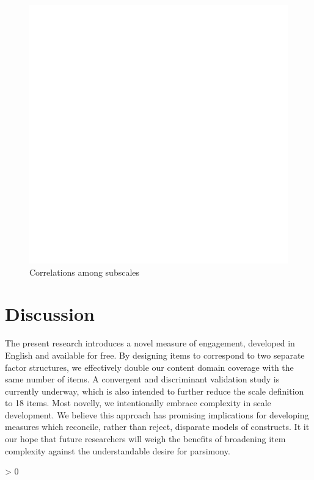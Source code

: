 \documentclass[
]{article}
\newlength{\cslhangindent}
\newenvironment{CSLReferences}[2] %
 {%
  \setlength{\parindent}{0pt}
  \ifodd #1 \everypar{\setlength{\hangindent}{\cslhangindent}}\ignorespaces\fi
  \ifnum #2 > 0
  \setlength{\parskip}{#2\baselineskip}
  \fi
 }%
 {}
\begin{document}
\begin{figure}

{\centering \includegraphics[width=0.8\linewidth]{corrplot} 

}

\caption{Correlations among subscales}\label{fig:corrplot}
\end{figure}

\hypertarget{discussion}{%
\section{Discussion}\label{discussion}}

The present research introduces a novel measure of engagement, developed
in English and available for free. By designing items to correspond to
two separate factor structures, we effectively double our content domain
coverage with the same number of items. A convergent and discriminant
validation study is currently underway, which is also intended to
further reduce the scale definition to 18 items. Most novelly, we
intentionally embrace complexity in scale development. We believe this
approach has promising implications for developing measures which
reconcile, rather than reject, disparate models of constructs. It it our
hope that future researchers will weigh the benefits of broadening item
complexity against the understandable desire for parsimony.

\begingroup
\setlength{\parindent}{-0.5in}
\setlength{\leftskip}{0.5in}

\hypertarget{refs}{}
\begin{CSLReferences}{0}{0}
\end{CSLReferences}
\end{document}

